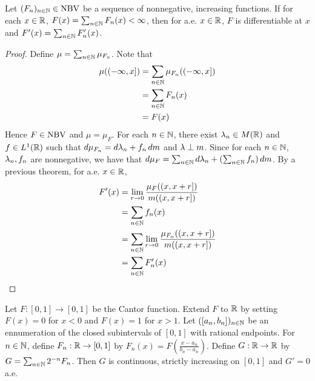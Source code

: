 \documentclass{book}
\begin{document}
	\begin{ex}  
		Let $(F_n)_{n\in \mathbb{N}} \in \text{NBV}$ be a sequence of nonnegative, increasing functions. If for each $x \in \mathbb{R}$, $F(x)=\sum_{n \in \mathbb{N}}F_n(x)< \infty$, then for a.e. $x \in \mathbb{R}$, $F$ is differentiable at $x$ and $F'(x) = \sum_{n\in \mathbb{N}}F_n'(x)$. 
	\end{ex}
	
	\begin{proof}
		
		Define $\mu = \sum_{n \in \mathbb{N}}\mu_{F_n}$. Note that 
		\begin{align*}
			\mu((-\infty,x]) 
			&= \sum_{n \in \mathbb{N}}\mu_{F_n}((-\infty,x]) \\
			&= \sum_{n \in \mathbb{N}}F_n(x)\\
			&= F(x)
		\end{align*}
		Hence $F \in \text{NBV}$ and $\mu=\mu_F$. For each $n \in \mathbb{N}$, there exist $\lambda_n \in M(\mathbb{R})$ and $f \in L^1(\mathbb{R})$ such that $d\mu_{F_n} = d\lambda_n + f_n\, d m$ and $\lambda \perp m$. Since for each $n \in \mathbb{N}$, $\lambda_n, f_n$ are nonnegative, we have that $d\mu_F =  \sum_{n \in \mathbb{N}} d\lambda_n + (\sum_{n \in \mathbb{N}}f_n)\, d m$. By a previous theorem, for a.e. $x \in \mathbb{R}$, 
		\begin{align*}
			F'(x) 
			&= \lim_{r \rightarrow 0}\frac{\mu_F((x,x+r])}{m((x,x+r])} \\
			&= \sum_{n \in \mathbb{N}}f_n(x)\\
			&= \sum_{n \in \mathbb{N}}\lim_{r \rightarrow 0}\frac{\mu_{F_n}((x,x+r])}{m((x,x+r])} \\
			&= \sum_{n \in \mathbb{N}}F_n'(x)
		\end{align*}
	\end{proof}
	
	\begin{ex}  
		Let $F:[0,1]\rightarrow [0, 1]$ be the Cantor function. Extend $F$ to $\mathbb{R}$ by setting $F(x) = 0$ for $x<0$ and $F(x)=1$ for $x>1$. Let $([a_n,b_n])_{n \in \mathbb{N}}$ be an ennumeration of the closed subintervals of $[0,1]$ with rational endpoints. For $n \in \mathbb{N}$, define $F_n:\mathbb{R} \rightarrow [0,1]$ by $F_n(x) = F(\frac{x-a_n}{b_n-a_n})$. Define $G:\mathbb{R} \rightarrow \mathbb{R}$ by $G = \sum_{n \in \mathbb{N}}2^{-n}F_n$. Then $G$ is continuous, strictly increasing on $[0,1]$ and $G'=0$ a.e.
	\end{ex}
	
\end{document}
